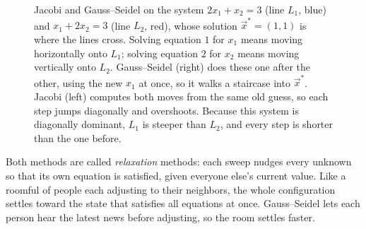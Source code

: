 \begin{figure}[H]
\caption{Jacobi and Gauss--Seidel on the system $2x_1+x_2=3$ (line $L_1$, blue) and
$x_1+2x_2=3$ (line $L_2$, red), whose solution $\vec{x}^*=(1,1)$ is where the lines
cross. Solving equation $1$ for $x_1$ means moving horizontally onto $L_1$; solving
equation $2$ for $x_2$ means moving vertically onto $L_2$. Gauss--Seidel (right) does
these one after the other, using the new $x_1$ at once, so it walks a staircase into
$\vec{x}^*$. Jacobi (left) computes both moves from the same old guess, so each step
jumps diagonally and overshoots. Because this system is diagonally dominant, $L_1$ is
steeper than $L_2$, and every step is shorter than the one before.}
\label{ch33:iterative-staircase}
\end{figure}

\begin{intuitionbox}
Both methods are called \emph{relaxation} methods: each sweep nudges every unknown so
that its own equation is satisfied, given everyone else's current value. Like a roomful
of people each adjusting to their neighbors, the whole configuration settles toward the
state that satisfies all equations at once. Gauss--Seidel lets each person hear the
latest news before adjusting, so the room settles faster.
\end{intuitionbox}

